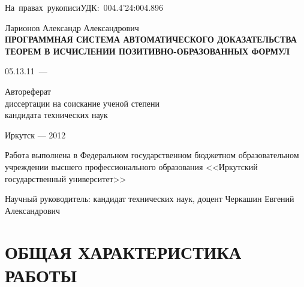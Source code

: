 \documentclass[a4paper]{report}
\begin{document}
\begin{titlepage}
\hfill{\vbox{\hbox{На правах рукописи}\hbox{\hfill УДК: 004.4'24:004.896}}}
\vspace{1cm}
\begin{center}
    Ларионов Александр Александрович \\
    \vspace{0.5cm}
\bf ПРОГРАММНАЯ СИСТЕМА АВТОМАТИЧЕСКОГО ДОКАЗАТЕЛЬСТВА ТЕОРЕМ В ИСЧИСЛЕНИИ ПОЗИТИВНО-ОБРАЗОВАННЫХ ФОРМУЛ
\end{center}
\vfill
\hfil\hbox{\hbox{05.13.11 --- }
    \hbox{}%
}\hfil
\vspace{1cm}
\begin{center}
    Автореферат \\
    диссертации на соискание ученой степени \\
    кандидата технических наук
\end{center}
\vfill
\vfill
\begin{center}
{Иркутск --- 2012}
\end{center}
\end{titlepage}

%
\def\namepc{\hbox{$\rm\mu{}$PrISM}}

\newpage

Работа выполнена в Федеральном государственном бюджетном образовательном учреждении высшего профессионального образования <<Иркутский государственный университет>>

Научный руководитель: кандидат технических наук, доцент Черкашин Евгений Александрович


\newpage

\section*{ОБЩАЯ ХАРАКТЕРИСТИКА РАБОТЫ}
\end{document}

